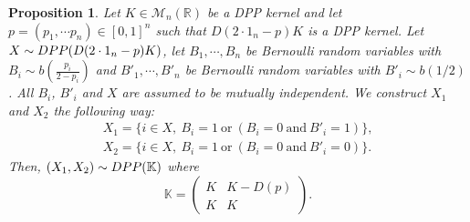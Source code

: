 \documentclass{article}
\numberwithin{equation}{section}
\newcommand{\bK}{\mathbb{K}}
\newcommand{\bR}{\mathbb{R}}
\newcommand{\DPP}{\textnormal{DPP}}
\theoremstyle{plain}
\newtheorem{proposition}{Proposition}[section]
\begin{document}
\begin{proposition}\label{prop: Construction_coupling}
Let $K\in\mathcal{M}_n(\bR)$ be a DPP kernel and let $p=(p_1,\cdots p_n)\in[0, 1]^n$ such that $D(2\cdot 1_n-p)K$ is a DPP kernel. Let $X\sim \DPP(D(2\cdot 1_n-p)K)$, let $B_1,\cdots, B_n$ be Bernoulli random variables with $B_i\sim b(\frac{p_i}{2-p_i})$ and $B'_1,\cdots, B'_n$ be Bernoulli random variables with $B'_i\sim b(1/2)$. All $B_i$, $B'_i$ and $X$ are assumed to be mutually independent. We construct $X_1$ and $X_2$ the following way:
\[\begin{array}{l}
X_1=\{i\in X,~B_i=1~\mbox{or}~(B_i=0~\mbox{and}~B'_i=1)\},\\
X_2=\{i\in X,~B_i=1~\mbox{or}~(B_i=0~\mbox{and}~B'_i=0)\}.
\end{array}\]
Then, $(X_1, X_2)\sim \DPP(\bK)$ where
\[\bK=\begin{pmatrix} K & K-D(p) \\
K & K
\end{pmatrix}.\]
\end{proposition}
\end{document}
